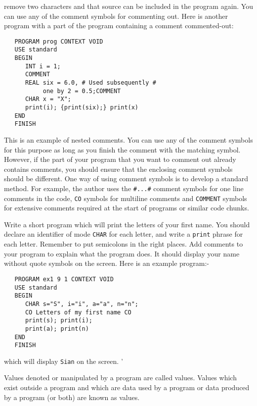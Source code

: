 remove two characters and that source can be included in the program
again.  You can use any of the comment symbols for commenting out.
Here is another program with a part of the program containing a
comment commented-out:
\begin{verbatim}
   PROGRAM prog CONTEXT VOID
   USE standard
   BEGIN
      INT i = 1;
      COMMENT
      REAL six = 6.0, # Used subsequently #
           one by 2 = 0.5;COMMENT
      CHAR x = "X";
      print(i); {print(six);} print(x)
   END
   FINISH
\end{verbatim}
\noindent
This is an example of nested comments. You can use any of the comment
symbols for this purpose as long as you finish the comment with the
matching symbol. However, if the part of your program that you want
to comment out already contains comments, you should ensure that the
enclosing comment symbols should be different. One way of using
comment symbols is to develop a standard method. For example, the
author uses the \verb|#...#| comment symbols for one line comments in
the code, \verb|CO| symbols for multiline comments and \verb|COMMENT|
symbols for extensive comments required at the start of programs or
similar code chunks.

\begin{exercise}
\item Write a short program which will print the letters of your
first name. You should declare an identifier of mode \verb|CHAR| for
each letter, and write a \verb|print| phrase for each letter.
Remember to put semicolons in the right places. Add comments to your
program to explain what the program does. \ans It should display your
name without quote symbols on the screen.  Here is an example
program:-
\begin{verbatim}
   PROGRAM ex1 9 1 CONTEXT VOID
   USE standard
   BEGIN
      CHAR s="S", i="i", a="a", n="n";
      CO Letters of my first name CO
      print(s); print(i);
      print(a); print(n)
   END
   FINISH
\end{verbatim}
\noindent
which will display \verb|Sian| on the screen.
'
\end{exercise}

Values denoted or manipulated by a program are called
 values.  Values which
exist outside a program and which are data used by a program or data
produced by a program (or both) are known as
 values.

